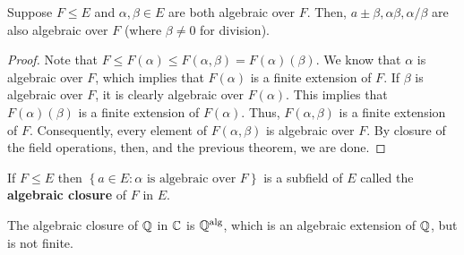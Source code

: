 \documentclass{../mathnotes}
\begin{document}
\begin{thm}
    Suppose $F\leq E$ and $\alpha,\beta\in E$ are both algebraic over $F$. Then, $a\pm \beta, \alpha\beta, \alpha/\beta$
    are also algebraic over $F$ (where $\beta\neq 0$ for division).
\end{thm}
\begin{proof}
    Note that $F\leq F(\alpha)\leq F(\alpha,\beta)=F(\alpha)(\beta)$. We know that $\alpha$ is algebraic over $F$, which
    implies that $F(\alpha)$ is a finite extension of $F$. If $\beta$ is algebraic over $F$, it is clearly algebraic over $F(\alpha)$.
    This implies that $F(\alpha)(\beta)$ is a finite extension of $F(\alpha)$. Thus, $F(\alpha,\beta)$ is a finite extension of $F$.
    Consequently, every element of $F(\alpha,\beta)$ is algebraic over $F$. By closure of the field operations, then, and the previous theorem,
    we are done.
\end{proof}

\begin{cor}
    If $F\leq E$ then $\left\{ a\in E:\alpha\text{ is algebraic over }F \right\}$ is a subfield of $E$ called the \textbf{algebraic closure} of
    $F$ in $E$.
\end{cor}

\begin{exmp}
    The algebraic closure of $\mathbb{Q}$ in $\mathbb{C}$ is $\mathbb{Q}^{\rm alg}$, which is an algebraic extension of $\mathbb{Q}$, but is not finite.
\end{exmp}
\end{document}
